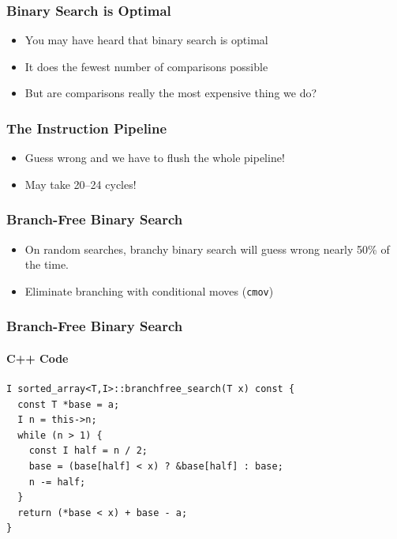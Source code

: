 \documentclass[xcolor=dvipsnames]{beamer}
\newcommand{\mi}[1]{\multiinclude[<+>][start=1,format=pdf]{#1}}
\begin{document}
\begin{frame}
   \frametitle{Binary Search is Optimal}

   \begin{itemize}[<+->]
     \item You may have heard that binary search is optimal
     \item It does the fewest number of comparisons possible
     \item But are comparisons really the most expensive thing we do?
   \end{itemize}
\end{frame}

\begin{frame}
   \frametitle{The Instruction Pipeline}

   \begin{center}
      \mi{figs/pipeline}
   \end{center}
   \vspace{-1em}
   \begin{itemize}
     \item<4->Guess wrong and we have to flush the whole pipeline!
     \item<5->May take 20--24 cycles!
   \end{itemize}
\end{frame}


\begin{frame}
   \frametitle{Branch-Free Binary Search}

   \begin{itemize}[<+->]
       \item On random searches, branchy binary search will guess 
                wrong nearly 50\% of the time.
       \item Eliminate branching with conditional moves (\texttt{\color{blue}cmov})
   \end{itemize}
\end{frame}


\begin{frame}[fragile]
   \frametitle{Branch-Free Binary Search}
   \framesubtitle{C++ Code}
\begin{verbatim}
I sorted_array<T,I>::branchfree_search(T x) const {
  const T *base = a;
  I n = this->n;
  while (n > 1) {
    const I half = n / 2;
    base = (base[half] < x) ? &base[half] : base;
    n -= half;
  }
  return (*base < x) + base - a;
}
\end{verbatim}
\end{frame}
\end{document}
